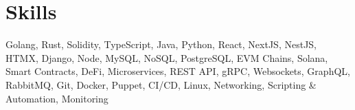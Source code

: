 
\section{Skills}

\begin{itemize}[leftmargin=0.15in, label={}]

\small{\item{{Golang, Rust, Solidity, TypeScript, Java, Python, React, NextJS, NestJS, HTMX, Django, Node, MySQL, NoSQL, PostgreSQL, EVM Chains, Solana, Smart Contracts, DeFi, Microservices, REST API, gRPC, Websockets, GraphQL, RabbitMQ, Git, Docker, Puppet, CI/CD, Linux, Networking, Scripting \& Automation, Monitoring} \\
}}

\end{itemize}

